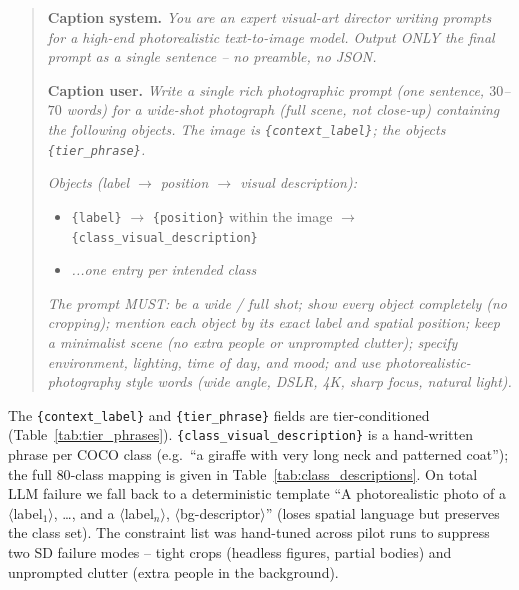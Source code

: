 \begin{quote}\small
\textbf{Caption system.} \emph{You are an expert visual-art director writing prompts for a high-end photorealistic text-to-image model. Output ONLY the final prompt as a single sentence -- no preamble, no JSON.}

\medskip
\textbf{Caption user.} \emph{Write a single rich photographic prompt (one sentence, $30$--$70$ words) for a wide-shot photograph (full scene, not close-up) containing the following objects. The image is \texttt{\{context\_label\}}; the objects \texttt{\{tier\_phrase\}}.}

\smallskip
\emph{Objects (label $\rightarrow$ position $\rightarrow$ visual
description):}
\begin{itemize}\setlength\itemsep{0pt}
\item \texttt{\{label\}} $\rightarrow$ \texttt{\{position\}} within the image $\rightarrow$ \texttt{\{class\_visual\_description\}} \item \emph{...one entry per intended class}
\end{itemize}

\emph{The prompt MUST: be a wide / full shot; show every object completely (no cropping); mention each object by its exact label and spatial position; keep a minimalist scene (no extra people or unprompted clutter); specify environment, lighting, time of day, and mood; and use photorealistic-photography style words (wide angle, DSLR, 4K, sharp focus, natural light).}
\end{quote}

The \texttt{\{context\_label\}} and \texttt{\{tier\_phrase\}} fields are tier-conditioned (Table~\ref{tab:tier_phrases}). \texttt{\{class\_\allowbreak visual\_\allowbreak description\}} is a hand-written phrase per COCO class (e.g.\ ``a giraffe with very long neck and patterned coat''); the full $80$-class mapping is given in Table~\ref{tab:class_descriptions}. On total LLM failure we fall back to a deterministic template ``A photorealistic photo of a $\langle$label$_1\rangle$, \dots, and a $\langle$label$_n\rangle$, $\langle$bg-descriptor$\rangle$'' (loses spatial language but preserves the class set). The constraint list was hand-tuned across pilot runs to suppress two SD failure modes -- tight crops (headless figures, partial bodies) and unprompted clutter (extra people in the background).

